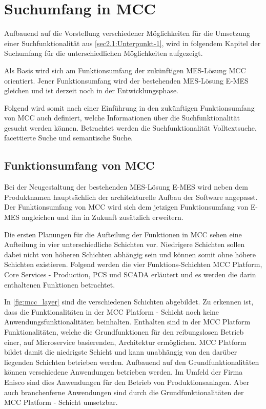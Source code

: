 \chapter{Suchumfang in MCC\label{chap3:Drittes-Kapitel}}

Aufbauend auf die Vorstellung verschiedener Möglichkeiten für die Umsetzung einer Suchfunktionalität aus \autoref{sec2.1:Unterpunkt-1}, wird in folgendem Kapitel der Suchumfang für die unterschiedlichen Möglichkeiten aufgezeigt.

Als Basis wird sich am Funktionsumfang der zukünftigen MES-Lösung \glqq MCC\grqq{} orientiert. Jener Funktionsumfang wird der bestehenden MES-Lösung \glqq E-MES\grqq{} gleichen und ist derzeit noch in der Entwicklungsphase.

Folgend wird somit nach einer Einführung in den zukünftigen Funktionsumfang von \glqq MCC\grqq{} auch definiert, welche Informationen über die Suchfunktionalität gesucht werden können. Betrachtet werden die Suchfunktionalität \glqq Volltextsuche\grqq{}, \glqq facettierte Suche\grqq{} und \glqq semantische Suche\grqq{}.

\section{Funktionsumfang von MCC\label{sec3.1:Unterunterpunkt-1}}

Bei der Neugestaltung der bestehenden MES-Lösung \glqq E-MES\grqq{} wird neben dem Produktnamen hauptsächlich der architekturelle Aufbau der Software angepasst. Der Funktionsumfang von \glqq MCC\grqq{} wird sich dem jetzigen Funktionsumfang von \glqq E-MES\grqq{} angleichen und ihn in Zukunft zusätzlich erweitern.

Die ersten Planungen für die Aufteilung der Funktionen in \glqq MCC\grqq{} sehen eine Aufteilung in vier unterschiedliche Schichten vor. Niedrigere Schichten sollen dabei nicht von höheren Schichten abhängig sein und können somit ohne höhere Schichten existieren. Folgend werden die vier Funktions-Schichten \glqq MCC Platform\grqq{}, \glqq Core Services - Production\grqq{}, \glqq PCS\grqq{} und \glqq SCADA\grqq{} erläutert und es werden die darin enthaltenen Funktionen betrachtet.

In \autoref{fig:mcc_layer} sind die verschiedenen Schichten abgebildet. Zu erkennen ist, dass die Funktionalitäten in der \glqq MCC Platform\grqq{} - Schicht noch keine Anwendungsfunktionalitäten beinhalten. Enthalten sind in der \glqq MCC Platform\grqq{} Funktionalitäten, welche die Grundfunktionen für den reibungslosen Betrieb einer, auf Microservice basierenden, Architektur ermöglichen. \glqq MCC Platform\grqq{} bildet damit die niedrigste Schicht und kann unabhängig von den darüber liegenden Schichten betrieben werden. Aufbauend auf den Grundfunktionalitäten können verschiedene Anwendungen betrieben werden. Im Umfeld der Firma Enisco sind dies Anwendungen für den Betrieb von Produktionsanlagen. Aber auch branchenferne Anwendungen sind durch die Grundfunktionalitäten der \glqq MCC Platform\grqq{} - Schicht umsetzbar.

